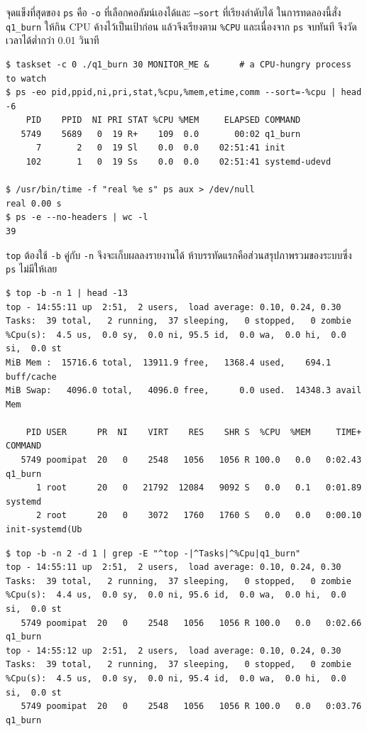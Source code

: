 \documentclass[a4paper,11pt]{article}
\newcommand{\code}[1]{\texttt{#1}}
\begin{document}
จุดแข็งที่สุดของ \code{ps} คือ \code{-o} ที่เลือกคอลัมน์เองได้และ \code{--sort}
ที่เรียงลำดับได้ ในการทดลองนี้สั่ง \code{q1\_burn} ให้กิน CPU ค้างไว้เป็นเป้าก่อน
แล้วจึงเรียงตาม \code{\%CPU} และเนื่องจาก \code{ps} จบทันที จึงวัดเวลาได้ต่ำกว่า
0.01 วินาที

\begin{lstlisting}[style=terminal,caption={\code{ps -eo ... --sort} และการวัดว่า \code{ps} จบทันที}]
$ taskset -c 0 ./q1_burn 30 MONITOR_ME &      # a CPU-hungry process to watch
$ ps -eo pid,ppid,ni,pri,stat,%cpu,%mem,etime,comm --sort=-%cpu | head -6
    PID    PPID  NI PRI STAT %CPU %MEM     ELAPSED COMMAND
   5749    5689   0  19 R+    109  0.0       00:02 q1_burn
      7       2   0  19 Sl    0.0  0.0    02:51:41 init
    102       1   0  19 Ss    0.0  0.0    02:51:41 systemd-udevd

$ /usr/bin/time -f "real %e s" ps aux > /dev/null
real 0.00 s
$ ps -e --no-headers | wc -l
39
\end{lstlisting}

\code{top} ต้องใช้ \code{-b} คู่กับ \code{-n} จึงจะเก็บผลลงรายงานได้
ห้าบรรทัดแรกคือส่วนสรุปภาพรวมของระบบซึ่ง \code{ps} ไม่มีให้เลย

\begin{lstlisting}[style=terminal,caption={\code{top -b -n 1} (ตัดมา 3 แถวแรก)}]
$ top -b -n 1 | head -13
top - 14:55:11 up  2:51,  2 users,  load average: 0.10, 0.24, 0.30
Tasks:  39 total,   2 running,  37 sleeping,   0 stopped,   0 zombie
%Cpu(s):  4.5 us,  0.0 sy,  0.0 ni, 95.5 id,  0.0 wa,  0.0 hi,  0.0 si,  0.0 st
MiB Mem :  15716.6 total,  13911.9 free,   1368.4 used,    694.1 buff/cache
MiB Swap:   4096.0 total,   4096.0 free,      0.0 used.  14348.3 avail Mem

    PID USER      PR  NI    VIRT    RES    SHR S  %CPU  %MEM     TIME+ COMMAND
   5749 poomipat  20   0    2548   1056   1056 R 100.0   0.0   0:02.43 q1_burn
      1 root      20   0   21792  12084   9092 S   0.0   0.1   0:01.89 systemd
      2 root      20   0    3072   1760   1760 S   0.0   0.0   0:00.10 init-systemd(Ub
\end{lstlisting}

\begin{lstlisting}[style=terminal,caption={\code{top -b -n 2 -d 1} สองภาพห่างกัน 1 วินาที}]
$ top -b -n 2 -d 1 | grep -E "^top -|^Tasks|^%Cpu|q1_burn"
top - 14:55:11 up  2:51,  2 users,  load average: 0.10, 0.24, 0.30
Tasks:  39 total,   2 running,  37 sleeping,   0 stopped,   0 zombie
%Cpu(s):  4.4 us,  0.0 sy,  0.0 ni, 95.6 id,  0.0 wa,  0.0 hi,  0.0 si,  0.0 st
   5749 poomipat  20   0    2548   1056   1056 R 100.0   0.0   0:02.66 q1_burn
top - 14:55:12 up  2:51,  2 users,  load average: 0.10, 0.24, 0.30
Tasks:  39 total,   2 running,  37 sleeping,   0 stopped,   0 zombie
%Cpu(s):  4.5 us,  0.0 sy,  0.0 ni, 95.4 id,  0.0 wa,  0.0 hi,  0.0 si,  0.0 st
   5749 poomipat  20   0    2548   1056   1056 R 100.0   0.0   0:03.76 q1_burn
\end{lstlisting}
\end{document}
